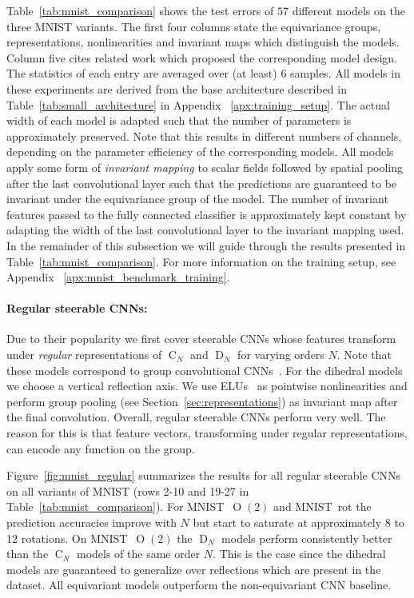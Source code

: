 \documentclass{article}
\newcommand{\apx}{Appendix\xspace
}
\renewcommand{\O}[1]{\ensuremath{\operatorname{O}(#1)}}
\newcommand{\DN}{\ensuremath{\operatorname{D}_{\!N}}}
\newcommand{\CN}{\ensuremath{\operatorname{C}_{\!N}}}
\begin{document}
Table~\ref{tab:mnist_comparison} shows the test errors of $57$ different models on the three MNIST variants.
The first four columns state the equivariance groups, representations, nonlinearities and invariant maps which distinguish the models.
Column five cites related work which proposed the corresponding model design.
The statistics of each entry are averaged over (at least) 6 samples.
All models in these experiments are derived from the base architecture described in Table~\ref{tab:small_architecture} in \apx~\ref{apx:training_setup}.
The actual width of each model is adapted such that the number of parameters is approximately preserved.
Note that this results in different numbers of channels, depending on the parameter efficiency of the corresponding models.
All models apply some form of \textit{invariant mapping} to scalar fields followed by spatial pooling after the last convolutional layer such that the predictions are guaranteed to be invariant under the equivariance group of the model.
The number of invariant features passed to the fully connected classifier is approximately kept constant by adapting the width of the last convolutional layer to the invariant mapping used.
In the remainder of this subsection we will guide through the results presented in Table~\ref{tab:mnist_comparison}.
For more information on the training setup, see \apx~\ref{apx:mnist_benchmark_training}.


\paragraph{Regular steerable CNNs:}
Due to their popularity we first cover steerable CNNs whose features transform under \textit{regular} representations of $\CN$ and $\DN$ for varying orders $N$.
Note that these models correspond to group convolutional CNNs~\cite{Cohen2016-GCNN,Weiler2018-STEERABLE}.
For the dihedral models we choose a vertical reflection axis.
We use ELUs~\cite{clevert2016ELUs} as pointwise nonlinearities and perform group pooling (see Section~\ref{sec:representations}) as invariant map after the final convolution.
Overall, regular steerable CNNs perform very well.
The reason for this is that feature vectors, transforming under regular representations, can encode any function on the group.

Figure~\ref{fig:mnist_regular} summarizes the results for all regular steerable CNNs on all variants of MNIST (rows 2-10 and 19-27 in Table~\ref{tab:mnist_comparison}).
For MNIST~$\O2$ and MNIST~rot the prediction accuracies improve with $N$ but start to saturate at approximately 8 to 12 rotations.
On MNIST~$\O2$ the $\DN$ models perform consistently better than the $\CN$ models of the same order $N$.
This is the case since the dihedral models are guaranteed to generalize over reflections which are present in the dataset.
All equivariant models outperform the non-equivariant CNN baseline.
\end{document}
